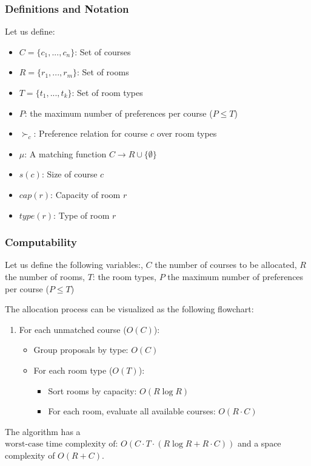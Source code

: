 \documentclass[a4paper, oneside]{article}
\theoremstyle{plain}
\begin{document}
\subsubsection{Definitions and Notation}
Let us define:
\begin{itemize}
    \item $C = \{c_1, ..., c_n\}$: Set of courses
    \item $R = \{r_1, ..., r_m\}$: Set of rooms
    \item $T = \{t_1, ..., t_k\}$: Set of room types
    \item $P$: the maximum number of preferences per course ($P \leq T$)
    \item $\succ_c$: Preference relation for course $c$ over room types
    \item $\mu$: A matching function $C \rightarrow R \cup \{\emptyset\}$
    \item $s(c)$: Size of course $c$
    \item $cap(r)$: Capacity of room $r$
    \item $type(r)$: Type of room $r$
\end{itemize}
\subsubsection{Computability}
Let us define the following variables:, $C$ the number of courses to be allocated, $R$ the number of rooms, $T$: the room types,
$P$ the maximum number of preferences per course ($P \leq T$)

The allocation process can be visualized as the following flowchart:
\begin{enumerate}
	\item For each unmatched course ($O(C)$):
	      \begin{itemize}
		      \item Group proposals by type: $O(C)$
		      \item For each room type ($O(T)$):
		            \begin{itemize}
			            \item Sort rooms by capacity: $O(R \log R)$
			            \item For each room, evaluate all available courses: $O(R \cdot C)$
		            \end{itemize}
	      \end{itemize}
\end{enumerate}

The algorithm has a $\boxed{\text{worst-case time complexity of: } O(C \cdot T \cdot (R \log R + R \cdot C))}$ and a space complexity of $O(R + C)$.
\end{document}
